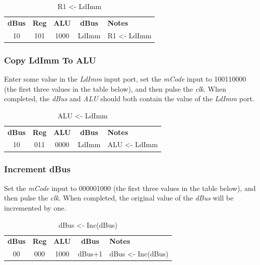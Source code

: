 \begin{table}[H]
	\sffamily
	\newcommand{\head}[1]{\textcolor{white}{\textbf{#1}}}		
	\begin{center}
		\begin{tabular}{ccccl} 
			\textbf{dBus} & \textbf{Reg} & \textbf{ALU} & \textbf{dBus} & \textbf{Notes} \\
			10 & 101 & 1000 & LdImm & R1 <- LdImm
		\end{tabular}
	\end{center}
	\caption{R1 <- LdImm}
	\label{tab:11-02}
\end{table}

\subsubsection{Copy LdImm To ALU}

Enter some value in the \textit{LdImm} input port, set the \textit{mCode} input to 100110000 (the first three values in the table below), and then pulse the \textit{clk}. When completed, the \textit{dBus} and \textit{ALU} should both contain the value of the \textit{LdImm} port.

\begin{table}[H]
	\sffamily
	\newcommand{\head}[1]{\textcolor{white}{\textbf{#1}}}		
	\begin{center}
		\begin{tabular}{ccccl} 
			\textbf{dBus} & \textbf{Reg} & \textbf{ALU} & \textbf{dBus} & \textbf{Notes} \\
			10 & 011 & 0000 & LdImm & ALU <- LdImm
		\end{tabular}
	\end{center}
	\caption{ALU <- LdImm}
	\label{tab:11-03}
\end{table}

\subsubsection{Increment dBus}

Set the \textit{mCode} input to 000001000 (the first three values in the table below), and then pulse the \textit{clk}. When completed, the original value of the \textit{dBus} will be incremented by one.

\begin{table}[H]
	\sffamily
	\newcommand{\head}[1]{\textcolor{white}{\textbf{#1}}}		
	\begin{center}
		\begin{tabular}{ccccl} 
			\textbf{dBus} & \textbf{Reg} & \textbf{ALU} & \textbf{dBus} & \textbf{Notes} \\
			00 & 000 & 1000 & dBus+1 & dBus <- Inc(dBus)
		\end{tabular}
	\end{center}
	\caption{dBus <- Inc(dBus)}
	\label{tab:11-04}
\end{table}

